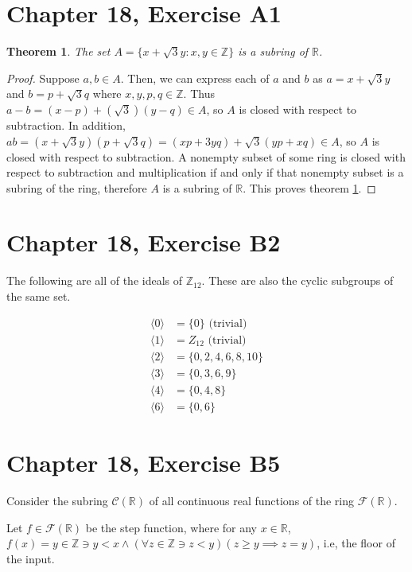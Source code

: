 \documentclass[12pt]{article}
\newcommand{\reals}{\mathbb{R}}
\newcommand{\ints}{\mathbb{Z}}
\newcommand{\freals}{\mathcal{F}(\reals)}
\newcommand{\creals}{\mathcal{C}(\reals)}
\newtheorem{thm}{Theorem}
\begin{document}
\section{Chapter 18, Exercise A1}

\begin{thm} \label{thm6}
	The set $A = \{x + \sqrt 3 y:x,y \in \ints\}$ is a subring of $\reals$.
\end{thm}

\begin{proof}
	Suppose $a,b \in A$.
	Then, we can express each of $a$ and $b$ as
	$a = x + \sqrt3y$ and $b = p + \sqrt3q$ where $x,y,p,q \in \ints$.
	Thus $a - b = (x - p) + (\sqrt 3)(y - q) \in A$,
	so $A$ is closed with respect to subtraction.
	In addition, $ab = (x + \sqrt 3 y)(p + \sqrt 3 q) = (xp + 3yq) + \sqrt 3 (yp + xq) \in A$,
	so $A$ is closed with respect to subtraction.
	A nonempty subset of some ring is closed with respect to
	subtraction and multiplication
	if and only if
	that nonempty subset is a subring of the ring,
	therefore $A$ is a subring of $\reals$.
	This proves theorem \ref{thm6}.
\end{proof}

\section{Chapter 18, Exercise B2}

The following are all of the ideals of $\ints_{12}$.
These are also the cyclic subgroups of the same set.

\begin{align*}
	\langle 0 \rangle & = \{0\} \text{ (trivial)} \\
	\langle 1 \rangle & = Z_{12} \text{ (trivial)} \\
	\langle 2 \rangle & = \{0, 2, 4, 6, 8, 10 \} \\
	\langle 3 \rangle & = \{0, 3, 6, 9 \} \\
	\langle 4 \rangle & = \{0, 4, 8 \} \\
	\langle 6 \rangle & = \{0, 6 \}
\end{align*}

\section{Chapter 18, Exercise B5}

Consider the subring $\creals$ of all continuous real functions of the ring $\freals$.

Let $f \in \freals$ be the step function,
where for any $x \in \reals$, $f(x) = y \in \ints \ni y < x \land
(\forall z \in \ints \ni z < y)(z \geq y \implies z = y)$, i.e, the floor of the input.
\end{document}
